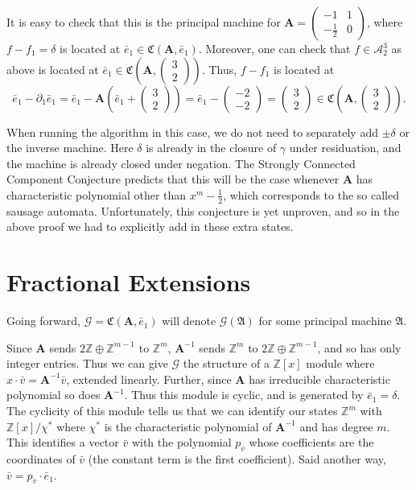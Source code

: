 \documentclass[runningheads]{llncs}
\newcommand{\A}{\mathcal{A}}
\newcommand{\G}{\mathcal{G}}
\renewcommand{\P}{\mathfrak{A}}
\newcommand{\Z}{\mathbb{Z}}
\newcommand{\2}{\textbf{2}}
\newcommand{\Am}{\textbf{A}}
\newcommand{\del}{\partial}
\newcommand{\vv}{\bar{v}}
\newcommand{\e}{\bar{e}}
\begin{document}
It is easy to check that this is the principal machine for
$\Am = \begin{pmatrix} -1 & 1 \\ -\frac{1}{2} & 0 \end{pmatrix}$,
where $f - f_1 = \delta$ is located at $\e_1 \in \mathfrak{C}(\Am, \e_1)$.
Moreover, one can check that $f \in \A^3_2$ as above is located at 
$\e_1 \in \mathfrak{C}\left ( \Am, \begin{pmatrix} 3 \\ 2 \end{pmatrix} \right )$.
Thus, $f - f_1$ is located at 
\[ 
  \e_1 - \del_1 \e_1 = 
  \e_1 - \Am \left ( \e_1 + \begin{pmatrix} 3 \\ 2 \end{pmatrix} \right ) = 
  \e_1 - \begin{pmatrix} -2 \\ -2 \end{pmatrix} =
  \begin{pmatrix} 3 \\ 2 \end{pmatrix} \in
  \mathfrak{C}\left ( \Am, \begin{pmatrix} 3 \\ 2 \end{pmatrix} \right ).
\]

When running the algorithm in this case, we do not need to separately add
$\pm \delta$ or the inverse machine. Here $\delta$ is already in the closure of
$\gamma$ under residuation, and the machine is already closed under negation. 
The Strongly Connected Component Conjecture 
predicts that this will be the case whenever $\Am$ has characteristic 
polynomial other than $x^m - \frac{1}{2}$, which corresponds to the so called 
sausage automata. Unfortunately, this conjecture is yet unproven,
and so in the above proof we had to explicitly add in these extra states.

\section{Fractional Extensions}
Going forward, $\G = \mathfrak{C}(\Am,\e_1)$ will denote $\G(\P)$ for some 
principal machine $\P$. 

Since $\Am$ sends $2\Z \oplus \Z^{m-1}$ to $\Z^m$, 
$\Am^{-1}$ sends $\Z^m$ to $2\Z \oplus \Z^{m-1}$, and so has 
only integer entries. Thus we can give $\G$ the structure of a 
$\Z[x]$ module where $x \cdot \vv = \Am^{-1}\vv$, extended linearly. Further, 
since $\Am$ has irreducible characteristic polynomial so does $\Am^{-1}$. Thus 
this module is cyclic, and is generated by $\e_1 = \delta$. The cyclicity of 
this module tells us that we can identify our states $\Z^m$ with $\Z[x] / \chi^*$ 
where $\chi^*$ is the characteristic polynomial of $\Am^{-1}$ and has degree 
$m$. This identifies a vector $\vv$ with the polynomial $p_{\vv}$ whose 
coefficients are the coordinates of $\vv$ (the constant term is the first 
coefficient). Said another way, $\vv = p_{\vv} \cdot \e_1$.
\end{document}
